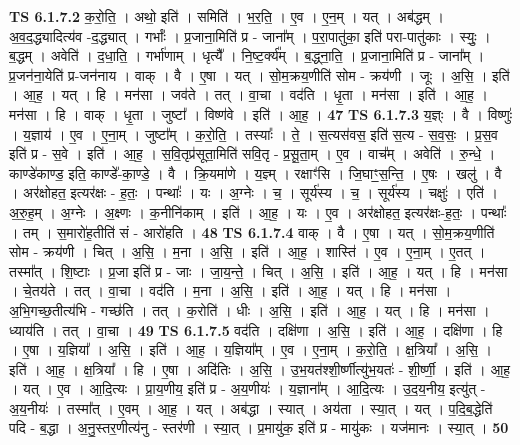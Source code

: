 \documentclass[17pt]{extarticle}
\begin{document}
                  \newline
                                \textbf{ TS 6.1.7.2} \newline
                  क॒रो॒ति॒ । अथो॒ इति॑ । समिति॑ । भ॒र॒ति॒ । ए॒व । ए॒न॒म् । यत् । अब॑द्धम् । अ॒व॒द॒द्ध्यादित्य॑व -द॒द्ध्यात् । गर्भाः᳚ । प्र॒जाना॒मिति॑ प्र - जाना᳚म् । प॒रा॒पातु॑का॒ इति॑ परा-पातु॑काः । स्युः॒ । ब॒द्धम् । अवेति॑ । द॒धा॒ति॒ । गर्भा॑णाम् । धृत्यै᳚ । नि॒ष्ट॒र्क्य᳚म् । ब॒द्ध्ना॒ति॒ । प्र॒जाना॒मिति॑ प्र - जाना᳚म् । प्र॒जन॑ना॒येति॑ प्र-जन॑नाय । वाक् । वै । ए॒षा । यत् । सो॒म॒क्रय॒णीति॑ सोम - क्रय॑णी । जूः । अ॒सि॒ । इति॑ । आ॒ह॒ । यत् । हि । मन॑सा । जव॑ते । तत् । वा॒चा । वद॑ति । धृ॒ता । मन॑सा । इति॑ । आ॒ह॒ । मन॑सा । हि । वाक् । धृ॒ता । जुष्टा᳚ । विष्ण॑वे । इति॑ । आ॒ह॒ । \textbf{  47} \newline
                  \newline
                                \textbf{ TS 6.1.7.3} \newline
                  य॒ज्ञ्ः । वै । विष्णुः॑ । य॒ज्ञाय॑ । ए॒व । ए॒ना॒म् । जुष्टा᳚म् । क॒रो॒ति॒ । तस्याः᳚ । ते॒ । स॒त्यस॑वस॒ इति॑ स॒त्य - स॒व॒सः॒ । प्र॒स॒व इति॑ प्र - स॒वे । इति॑ । आ॒ह॒ । स॒वि॒तृप्र॑सूता॒मिति॑ सवि॒तृ - प्र॒सू॒ता॒म् । ए॒व । वाच᳚म् । अवेति॑ । रु॒न्धे॒ । काण्डे॑काण्ड॒ इति॒ काण्डे᳚-का॒ण्डे॒ । वै । क्रि॒यमा॑णे । य॒ज्ञ्म् । रक्षाꣳ॑सि । जि॒घाꣳ॒॒स॒न्ति॒ । ए॒षः । खलु॑ । वै । अर॑क्षोहत॒ इत्यर॑क्षः - ह॒तः॒ । पन्थाः᳚ । यः । अ॒ग्नेः । च॒ । सूर्य॑स्य । च॒ । सूर्य॑स्य । चक्षुः॑ । एति॑ । अ॒रु॒ह॒म् । अ॒ग्नेः । अ॒क्ष्णः । क॒नीनि॑काम् । इति॑ । आ॒ह॒ । यः । ए॒व । अर॑क्षोहत॒ इत्यर॑क्षः-ह॒तः॒ । पन्थाः᳚ । तम् । स॒मारो॑ह॒तीति॑ सं - आरो॑हति । \textbf{  48} \newline
                  \newline
                                \textbf{ TS 6.1.7.4} \newline
                  वाक् । वै । ए॒षा । यत् । सो॒म॒क्रय॒णीति॑ सोम - क्रय॑णी । चित् । अ॒सि॒ । म॒ना । अ॒सि॒ । इति॑ । आ॒ह॒ । शास्ति॑ । ए॒व । ए॒ना॒म् । ए॒तत् । तस्मा᳚त् । शि॒ष्टाः । प्र॒जा इति॑ प्र - जाः । जा॒य॒न्ते॒ । चित् । अ॒सि॒ । इति॑ । आ॒ह॒ । यत् । हि । मन॑सा । चे॒तय॑ते । तत् । वा॒चा । वद॑ति । म॒ना । अ॒सि॒ । इति॑ । आ॒ह॒ । यत् । हि । मन॑सा । अ॒भि॒गच्छ॒तीत्य॑भि - गच्छ॑ति । तत् । क॒रोति॑ । धीः । अ॒सि॒ । इति॑ । आ॒ह॒ । यत् । हि । मन॑सा । ध्याय॑ति । तत् । वा॒चा । \textbf{  49} \newline
                  \newline
                                \textbf{ TS 6.1.7.5} \newline
                  वद॑ति । दक्षि॑णा । अ॒सि॒ । इति॑ । आ॒ह॒ । दक्षि॑णा । हि । ए॒षा । य॒ज्ञिया᳚ । अ॒सि॒ । इति॑ । आ॒ह॒ । य॒ज्ञिया᳚म् । ए॒व । ए॒ना॒म् । क॒रो॒ति॒ । क्ष॒त्रिया᳚ । अ॒सि॒ । इति॑ । आ॒ह॒ । क्ष॒त्रिया᳚ । हि । ए॒षा । अदि॑तिः । अ॒सि॒ । उ॒भ॒यत॑श्शी॒र्ष्णीत्यु॑भ॒यतः॑ - शी॒र्ष्णी॒ । इति॑ । आ॒ह॒ । यत् । ए॒व । आ॒दि॒त्यः । प्रा॒य॒णीय॒ इति॑ प्र - अ॒य॒णीयः॑ । य॒ज्ञाना᳚म् । आ॒दि॒त्यः । उ॒द॒य॒नीय॒ इत्यु॑त् - अ॒य॒नीयः॑ । तस्मा᳚त् । ए॒वम् । आ॒ह॒ । यत् । अब॑द्धा । स्यात् । अय॑ता । स्या॒त् । यत् । प॒दि॒ब॒द्धेति॑ पदि - ब॒द्धा । अ॒नु॒स्तर॒णीत्य॑नु - स्तर॑णी । स्या॒त् । प्र॒मायु॑क॒ इति॑ प्र - मायु॑कः । यज॑मानः । स्या॒त् । \textbf{  50} \newline
\end{document}
